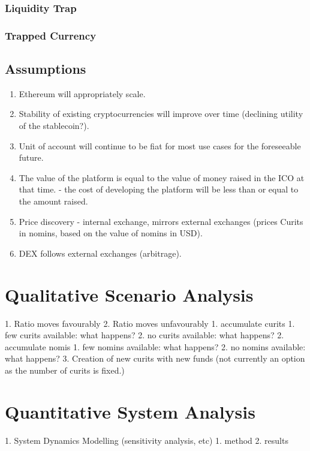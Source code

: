 \documentclass{article}
\begin{document}
\subsubsection{Liquidity Trap}
\subsubsection{Trapped Currency}

\subsection{Assumptions}

\begin{enumerate}
	\item Ethereum will appropriately scale.
	\item Stability of existing cryptocurrencies will improve over time (declining utility of the stablecoin?).
	\item Unit of account will continue to be fiat for most use cases for the foreseeable future.
	\item The value of the platform is equal to the value of money raised in the ICO at that time.
   - the cost of developing the platform will be less than or equal to the amount raised.
	\item Price discovery - internal exchange, mirrors external exchanges (prices Curits in nomins, based on the value of nomins in USD).
	\item DEX follows external exchanges (arbitrage).
\end{enumerate}

\pagebreak
\section{Qualitative Scenario Analysis}

1. Ratio moves favourably
2. Ratio moves unfavourably
   1. accumulate curits
      1. few curits available: what happens?
      2. no curits available: what happens?
   2. accumulate nomis
      1. few nomins available: what happens?
      2. no nomins available: what happens?
3. Creation of new curits with new funds (not currently an option as the number of curits is fixed.)


\pagebreak
\section{Quantitative System Analysis}

1. System Dynamics Modelling (sensitivity analysis, etc)
   1. method
   2. results
\end{document}
